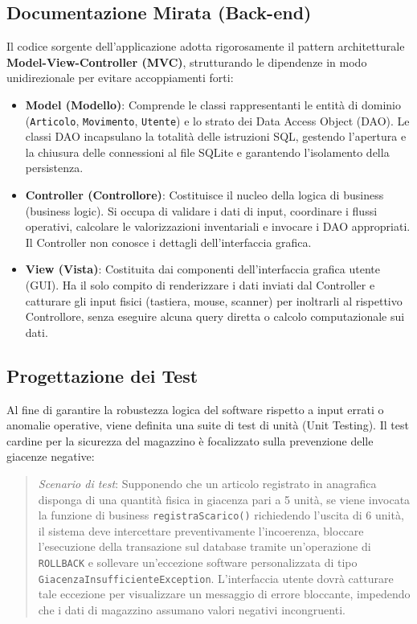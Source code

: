 \documentclass[a4paper,12pt]{article}
\begin{document}
	\subsection{Documentazione Mirata (Back-end)}
	Il codice sorgente dell'applicazione adotta rigorosamente il pattern architetturale \textbf{Model-View-Controller (MVC)}, strutturando le dipendenze in modo unidirezionale per evitare accoppiamenti forti:
	\begin{itemize}
		\item \textbf{Model (Modello)}: Comprende le classi rappresentanti le entità di dominio (\texttt{Articolo}, \texttt{Movimento}, \texttt{Utente}) e lo strato dei Data Access Object (DAO). Le classi DAO incapsulano la totalità delle istruzioni SQL, gestendo l'apertura e la chiusura delle connessioni al file SQLite e garantendo l'isolamento della persistenza.
		\item \textbf{Controller (Controllore)}: Costituisce il nucleo della logica di business (business logic). Si occupa di validare i dati di input, coordinare i flussi operativi, calcolare le valorizzazioni inventariali e invocare i DAO appropriati. Il Controller non conosce i dettagli dell'interfaccia grafica.
		\item \textbf{View (Vista)}: Costituita dai componenti dell'interfaccia grafica utente (GUI). Ha il solo compito di renderizzare i dati inviati dal Controller e catturare gli input fisici (tastiera, mouse, scanner) per inoltrarli al rispettivo Controllore, senza eseguire alcuna query diretta o calcolo computazionale sui dati.
	\end{itemize}
	
	\subsection{Progettazione dei Test}
	Al fine di garantire la robustezza logica del software rispetto a input errati o anomalie operative, viene definita una suite di test di unità (Unit Testing). Il test cardine per la sicurezza del magazzino è focalizzato sulla prevenzione delle giacenze negative:
	\begin{quote}
		\textit{Scenario di test}: Supponendo che un articolo registrato in anagrafica disponga di una quantità fisica in giacenza pari a 5 unità, se viene invocata la funzione di business \texttt{registraScarico()} richiedendo l'uscita di 6 unità, il sistema deve intercettare preventivamente l'incoerenza, bloccare l'esecuzione della transazione sul database tramite un'operazione di \texttt{ROLLBACK} e sollevare un'eccezione software personalizzata di tipo \texttt{GiacenzaInsufficienteException}. L'interfaccia utente dovrà catturare tale eccezione per visualizzare un messaggio di errore bloccante, impedendo che i dati di magazzino assumano valori negativi incongruenti.
	\end{quote}
	
\end{document}
